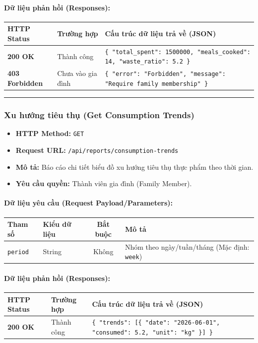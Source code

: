 \documentclass[12pt,a4paper]{article}
\begin{document}
\paragraph{Dữ liệu phản hồi (Responses):}
\begin{longtable}{|p{2.8cm}|p{3.2cm}|p{8.0cm}|}
\hline
\textbf{HTTP Status} & \textbf{Trường hợp} & \textbf{Cấu trúc dữ liệu trả về (JSON)} \\ \hline
\endhead
\textbf{200 OK} & Thành công & \texttt{\{ "total\_spent": 1500000, "meals\_cooked": 14, "waste\_ratio": 5.2 \}} \\ \hline
\textbf{403 Forbidden} & Chưa vào gia đình & \texttt{\{ "error": "Forbidden", "message": "Require family membership" \}} \\ \hline
\end{longtable}

\vskip 0.4cm
\noindent\rule{\textwidth}{0.3pt}
\vskip 0.4cm

\subsubsection{Xu hướng tiêu thụ (Get Consumption Trends)}
\begin{itemize}[leftmargin=*]
    \item \textbf{HTTP Method:} \texttt{GET}
    \item \textbf{Request URL:} \texttt{/api/reports/consumption-trends}
    \item \textbf{Mô tả:} Báo cáo chi tiết biểu đồ xu hướng tiêu thụ thực phẩm theo thời gian.
    \item \textbf{Yêu cầu quyền:} Thành viên gia đình (Family Member).
\end{itemize}

\paragraph{Dữ liệu yêu cầu (Request Payload/Parameters):}
\begin{longtable}{|p{2.8cm}|p{2.2cm}|c|p{7.0cm}|}
\hline
\textbf{Tham số} & \textbf{Kiểu dữ liệu} & \textbf{Bắt buộc} & \textbf{Mô tả} \\ \hline
\endhead
\texttt{period} & String & Không & Nhóm theo ngày/tuần/tháng (Mặc định: \texttt{week}) \\ \hline
\end{longtable}

\paragraph{Dữ liệu phản hồi (Responses):}
\begin{longtable}{|p{2.8cm}|p{3.2cm}|p{8.0cm}|}
\hline
\textbf{HTTP Status} & \textbf{Trường hợp} & \textbf{Cấu trúc dữ liệu trả về (JSON)} \\ \hline
\endhead
\textbf{200 OK} & Thành công & \texttt{\{ "trends": [\{ "date": "2026-06-01", "consumed": 5.2, "unit": "kg" \}] \}} \\ \hline
\end{longtable}
\end{document}
